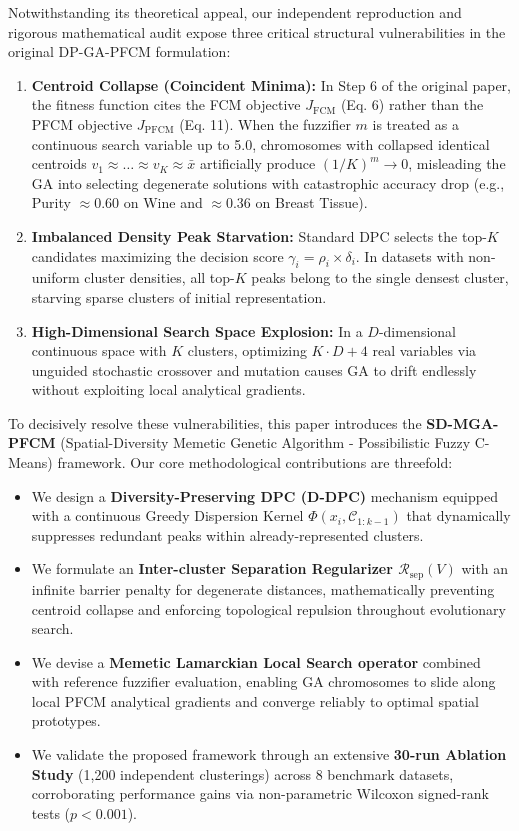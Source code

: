 \documentclass[preprint,12pt]{elsarticle}
\begin{document}
Notwithstanding its theoretical appeal, our independent reproduction and rigorous mathematical audit expose three critical structural vulnerabilities in the original DP-GA-PFCM formulation:
\begin{enumerate}
    \item \textbf{Centroid Collapse (Coincident Minima):} In Step 6 of the original paper, the fitness function cites the FCM objective $J_{\text{FCM}}$ (Eq. 6) rather than the PFCM objective $J_{\text{PFCM}}$ (Eq. 11). When the fuzzifier $m$ is treated as a continuous search variable up to 5.0, chromosomes with collapsed identical centroids $v_1 \approx \dots \approx v_K \approx \bar{x}$ artificially produce $(1/K)^m \to 0$, misleading the GA into selecting degenerate solutions with catastrophic accuracy drop (e.g., Purity $\approx 0.60$ on Wine and $\approx 0.36$ on Breast Tissue).
    \item \textbf{Imbalanced Density Peak Starvation:} Standard DPC selects the top-$K$ candidates maximizing the decision score $\gamma_i = \rho_i \times \delta_i$. In datasets with non-uniform cluster densities, all top-$K$ peaks belong to the single densest cluster, starving sparse clusters of initial representation.
    \item \textbf{High-Dimensional Search Space Explosion:} In a $D$-dimensional continuous space with $K$ clusters, optimizing $K \cdot D + 4$ real variables via unguided stochastic crossover and mutation causes GA to drift endlessly without exploiting local analytical gradients.
\end{enumerate}

To decisively resolve these vulnerabilities, this paper introduces the \textbf{SD-MGA-PFCM} (Spatial-Diversity Memetic Genetic Algorithm - Possibilistic Fuzzy C-Means) framework. Our core methodological contributions are threefold:
\begin{itemize}
    \item We design a \textbf{Diversity-Preserving DPC (D-DPC)} mechanism equipped with a continuous Greedy Dispersion Kernel $\Phi(x_i, \mathcal{C}_{1:k-1})$ that dynamically suppresses redundant peaks within already-represented clusters.
    \item We formulate an \textbf{Inter-cluster Separation Regularizer $\mathcal{R}_{\text{sep}}(V)$} with an infinite barrier penalty for degenerate distances, mathematically preventing centroid collapse and enforcing topological repulsion throughout evolutionary search.
    \item We devise a \textbf{Memetic Lamarckian Local Search operator} combined with reference fuzzifier evaluation, enabling GA chromosomes to slide along local PFCM analytical gradients and converge reliably to optimal spatial prototypes.
    \item We validate the proposed framework through an extensive \textbf{30-run Ablation Study} (1,200 independent clusterings) across 8 benchmark datasets, corroborating performance gains via non-parametric Wilcoxon signed-rank tests ($p < 0.001$).
\end{itemize}
\end{document}
